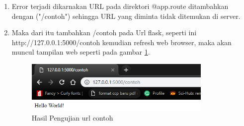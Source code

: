 \begin{enumerate}
\item Error terjadi dikarnakan URL pada direktori @app.route ditambahkan dengan ("/contoh") sehingga URL yang diminta tidak ditemukan di server. 
\item Maka dari itu tambahkan /contoh pada Url flask, seperti ini  http://127.0.0.1:5000/contoh kemudian refresh web browser, maka akan muncul tampilan web seperti pada gambar \ref{fig:hujiurlc}.
\begin{figure}[!htbp]
	\centerline{\includegraphics[width=0.85\textwidth]{figures/9/hujiurlc.PNG}}
	\caption{Hasil Pengujian url contoh}
	\label{fig:hujiurlc}
\end{figure}
\end{enumerate}

